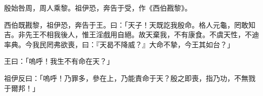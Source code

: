 
\begin{pinyinscope}
殷始咎周，周人乘黎。祖伊恐，奔告于受，作《西伯戡黎》。

西伯既戡黎，祖伊恐，奔告于王。曰：「天子！天既訖我殷命。格人元龜，罔敢知吉。非先王不相我後人，惟王淫戲用自絕。故天棄我，不有康食。不虞天性，不迪率典。今我民罔弗欲喪，曰：『天曷不降威？』大命不摯，今王其如台？」

王曰：「嗚呼！我生不有命在天？」

祖伊反曰：「嗚呼！乃罪多，參在上，乃能責命于天？殷之即喪，指乃功，不無戮于爾邦！」


\end{pinyinscope}